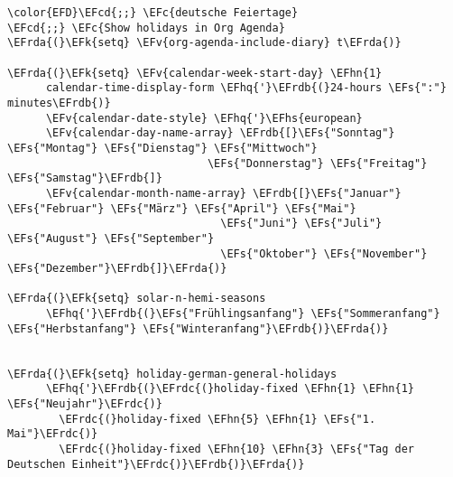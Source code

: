 \documentclass[a4wide,10pt]{article}
\newcommand{\EFc}[1]{\textcolor{EFc}{#1}} %
\newcommand{\EFcd}[1]{\textcolor{EFcd}{#1}} %
\newcommand{\EFs}[1]{\textcolor{EFs}{#1}} %
\newcommand{\EFk}[1]{\textcolor{EFk}{#1}} %
\newcommand{\EFv}[1]{\textcolor{EFv}{#1}} %
\newcommand{\EFhn}[1]{\textcolor{EFhn}{\textbf{#1}}} %
\newcommand{\EFhq}[1]{\textcolor{EFhq}{#1}} %
\newcommand{\EFhs}[1]{\textcolor{EFhs}{#1}} %
\newcommand{\EFrda}[1]{\textcolor{EFrda}{#1}} %
\newcommand{\EFrdb}[1]{\textcolor{EFrdb}{#1}} %
\newcommand{\EFrdc}[1]{\textcolor{EFrdc}{#1}} %
\begin{document}
\begin{Code}
\begin{Verbatim}
\color{EFD}\EFcd{;;} \EFc{deutsche Feiertage}
\EFcd{;;} \EFc{Show holidays in Org Agenda}
\EFrda{(}\EFk{setq} \EFv{org-agenda-include-diary} t\EFrda{)}

\EFrda{(}\EFk{setq} \EFv{calendar-week-start-day} \EFhn{1}
      calendar-time-display-form \EFhq{'}\EFrdb{(}24-hours \EFs{":"} minutes\EFrdb{)}
      \EFv{calendar-date-style} \EFhq{'}\EFhs{european}
      \EFv{calendar-day-name-array} \EFrdb{[}\EFs{"Sonntag"} \EFs{"Montag"} \EFs{"Dienstag"} \EFs{"Mittwoch"}
                               \EFs{"Donnerstag"} \EFs{"Freitag"} \EFs{"Samstag"}\EFrdb{]}
      \EFv{calendar-month-name-array} \EFrdb{[}\EFs{"Januar"} \EFs{"Februar"} \EFs{"März"} \EFs{"April"} \EFs{"Mai"}
                                 \EFs{"Juni"} \EFs{"Juli"} \EFs{"August"} \EFs{"September"}
                                 \EFs{"Oktober"} \EFs{"November"} \EFs{"Dezember"}\EFrdb{]}\EFrda{)}

\EFrda{(}\EFk{setq} solar-n-hemi-seasons
      \EFhq{'}\EFrdb{(}\EFs{"Frühlingsanfang"} \EFs{"Sommeranfang"} \EFs{"Herbstanfang"} \EFs{"Winteranfang"}\EFrdb{)}\EFrda{)}


\EFrda{(}\EFk{setq} holiday-german-general-holidays
      \EFhq{'}\EFrdb{(}\EFrdc{(}holiday-fixed \EFhn{1} \EFhn{1} \EFs{"Neujahr"}\EFrdc{)}
        \EFrdc{(}holiday-fixed \EFhn{5} \EFhn{1} \EFs{"1. Mai"}\EFrdc{)}
        \EFrdc{(}holiday-fixed \EFhn{10} \EFhn{3} \EFs{"Tag der Deutschen Einheit"}\EFrdc{)}\EFrdb{)}\EFrda{)}


\end{Verbatim}
\end{Code}
\end{document}

